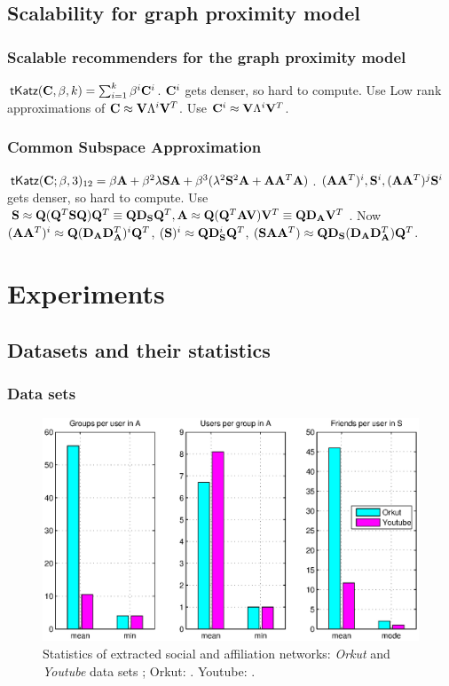 \documentclass{beamer}
\begin{document}
\subsection{Scalability for graph proximity model}
\begin{frame}
\frametitle{Scalable recommenders for the graph proximity model}
\begin{itemize}
\pitem $\textsf{tKatz}(\mathbf{C}, \beta, k) = \sum_{i=1}^{k} \beta^i \mathbf{C}^i $.
\pitem $\mathbf{C}^i$ gets denser, so hard to compute.
\pitem Use Low rank approximations of $\mathbf{C} \approx \mathbf{V}\Lambda^{i}\mathbf{V}^{T}$.  Use $\mathbf{C}^i \approx \mathbf{V}\Lambda^{i}\mathbf{V}^{T}$. \cite{vasukiScalableAffiliationRec}
\end{itemize}
\end{frame}

\begin{frame}
\frametitle{Common Subspace Approximation}
\begin{itemize}
\pitem $\textsf{tKatz}(\mathbf{C};\beta,3)_{12} = \beta \mathbf{A} + \beta^2 \lambda \mathbf{S} \mathbf{A} +  \beta^3(\lambda^2 \mathbf{S}^2 \mathbf{A} + \mathbf{A} \mathbf{A}^T \mathbf{A})$.
\pitem $(\mathbf{A}\mathbf{A}^{T})^i, \mathbf{S}^{i}, (\mathbf{A}\mathbf{A}^{T})^{j}\mathbf{S}^{i}$ gets denser, so hard to compute.
\pitem Use $\mathbf{S} \approx \mathbf{Q} (\mathbf{Q}^T \mathbf{S} \mathbf{Q}) \mathbf{Q}^T \equiv\mathbf{Q} \mathbf{D}_{\mathbf{S}} \mathbf{Q}^T,  \mathbf{A} \approx \mathbf{Q} (\mathbf{Q}^T \mathbf{A}\mathbf{V}) \mathbf{V}^T \equiv\mathbf{Q} \mathbf{D}_{\mathbf{A}} \mathbf{V}^T$.
\pitem Now $(\mathbf{A}\mathbf{A}^{T})^i \approx \mathbf{Q}(\mathbf{D}_{\mathbf{A}}\mathbf{D}_{\mathbf{A}}^{T})^{i} \mathbf{Q}^T$, $(\mathbf{S})^i \approx \mathbf{Q}\mathbf{D}_{\mathbf{S}}^{i} \mathbf{Q}^T$, $(\mathbf{S}\mathbf{A}\mathbf{A}^{T}) \approx \mathbf{Q}\mathbf{D}_{\mathbf{S}} (\mathbf{D}_{\mathbf{A}}\mathbf{D}_{\mathbf{A}}^{T}) \mathbf{Q}^T$.
\end{itemize}
\end{frame}

\section{Experiments}
\subsection{Datasets and their statistics}
\begin{frame}
\frametitle{Data sets}
\begin{figure}
\includegraphics[scale=0.4]{figures/stats.eps}
\caption{Statistics of extracted social and affiliation networks: \emph{Orkut} and \emph{Youtube} data sets \cite{Mislove}; Orkut: . Youtube: .}
\end{figure}
\end{frame}
\end{document}
